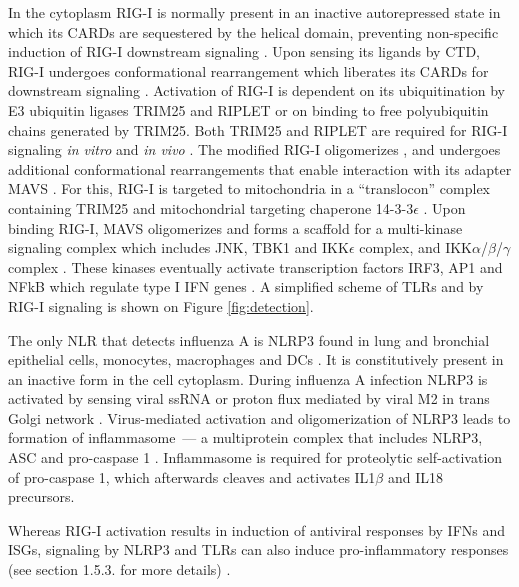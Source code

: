 		In the cytoplasm \gls{RIG-I} is normally present in an inactive autorepressed state in which its \glspl{CARD} are sequestered by the helical domain, preventing non-specific induction of \gls{RIG-I} downstream signaling \parencite{Kowalinski2011}. Upon sensing its ligands by \gls{CTD}, \gls{RIG-I} undergoes conformational rearrangement which liberates its \glspl{CARD} for downstream signaling \parencite{Kowalinski2011}. Activation of \gls{RIG-I} is  dependent on its ubiquitination by E3 ubiquitin ligases TRIM25 and RIPLET or on binding to free polyubiquitin chains generated by TRIM25. Both TRIM25 and RIPLET are required for \gls{RIG-I} signaling \textit{in vitro} and \textit{in vivo} \parencite{Gack2007, Oshiumi2010, Zeng2010}. The modified \gls{RIG-I} oligomerizes \parencite{Patel2013}, and undergoes additional conformational rearrangements that enable interaction with its adapter \gls{MAVS} \parencite{Kawai2005, Seth2005}. For this, \gls{RIG-I} is targeted to mitochondria in a ``translocon'' complex containing TRIM25 and mitochondrial targeting chaperone 14-3-3$\epsilon$ \parencite{Liu2012}. Upon binding \gls{RIG-I}, \gls{MAVS} oligomerizes and forms a scaffold for a multi-kinase signaling complex which includes \gls{JNK}, \gls{TBK1} and \gls{IKK}$\epsilon$ complex, and \gls{IKK}$\alpha$/$\beta$/$\gamma$ complex \parencite{McWhirter2005}. These kinases eventually activate transcription factors \gls{IRF}3, \gls{AP1} and \gls{NFkB} which regulate type I \gls{IFN} genes \parencite{McWhirter2005}. A simplified scheme of \glspl{TLR} and by \gls{RIG-I} signaling is shown on Figure \ref{fig:detection}.
		
		The only \gls{NLR} that detects influenza A is \gls{NLRP3} found in lung and bronchial epithelial cells, monocytes, macrophages and \gls{DC}s \parencite{Guarda2011, Kim2014}. It is constitutively present in an inactive form in the cell cytoplasm. During influenza A infection \gls{NLRP3} is activated by sensing viral \gls{ssRNA} or proton flux mediated by viral \gls{M2} in trans Golgi network \parencite{Thomas2009, Ichinohe2010, Allen2009}. Virus-mediated activation and oligomerization of \gls{NLRP3} leads to formation of inflammasome~--- a multiprotein complex that includes \gls{NLRP3}, \gls{ASC} and pro-caspase 1 \parencite{Tschopp2010}. Inflammasome is required for proteolytic self-activation of pro-caspase 1, which afterwards cleaves and activates IL1$\beta$ and IL18 precursors.
	
		Whereas \gls{RIG-I} activation results in induction of antiviral responses by \gls{IFN}s and \gls{ISG}s, signaling by \gls{NLRP3} and \glspl{TLR} can also induce pro-inflammatory responses (see section 1.5.3. for more details) \parencite{LeGoffic2007, Allen2009, Kawai2007}. 
		
